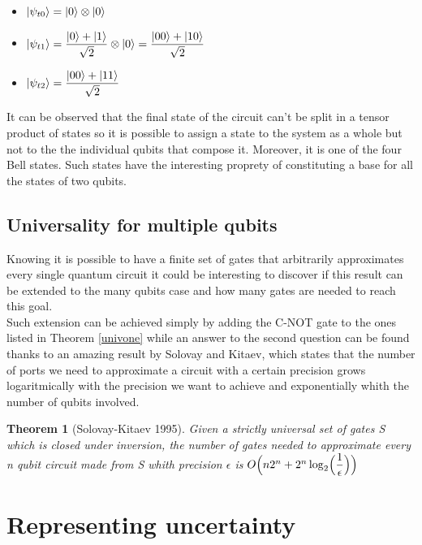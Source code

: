 \documentclass{article}
\newtheorem{theorem}{Theorem}
\begin{document}
\begin{itemize}
	\item $\ket{\psi_{t0}} = \ket{0} \otimes \ket{0}$
	\item $\ket{\psi_{t1}} = \dfrac{\ket{0}+\ket{1}}{\sqrt{2}} \otimes \ket{0} = \dfrac{\ket{00}+\ket{10}}{\sqrt{2}}$
	\item $\ket{\psi_{t2}} = \dfrac{\ket{00}+\ket{11}}{\sqrt{2}}$

\end{itemize}
It can be observed that the final state of the circuit can't be split
in a tensor product of states so it is possible to assign a state to
the system as a whole but not to the the individual qubits that compose it.
Moreover, it is one of the four Bell states.
Such states have the interesting proprety of constituting a base for all
the states of two qubits.


\subsection{Universality for multiple qubits}
Knowing it is possible to have a finite set of gates that arbitrarily approximates
every single quantum circuit it could be interesting to discover if this result
can be extended to the many qubits case and how many gates are needed to reach this goal.\\
Such extension can be achieved simply by adding the C-NOT gate to the ones listed in
Theorem \ref{univone} while an answer to the second question can be found
thanks to an amazing result by Solovay and Kitaev, which
states that the number of ports we need to approximate a circuit with a certain
precision grows logaritmically with the precision we want to achieve and exponentially
whith the number of qubits involved.

\begin{theorem}[Solovay-Kitaev 1995]

	Given a strictly universal set of gates S which is closed under inversion,
	the number of gates needed to approximate every n qubit circuit made
	from S whith precision $\epsilon$ is
	$O\Bigl(n2^n+2^n\log_2 \Bigl( \dfrac{1}{\epsilon}\Bigl)\Bigl)$

\end{theorem}



\section{Representing uncertainty}
\end{document}
